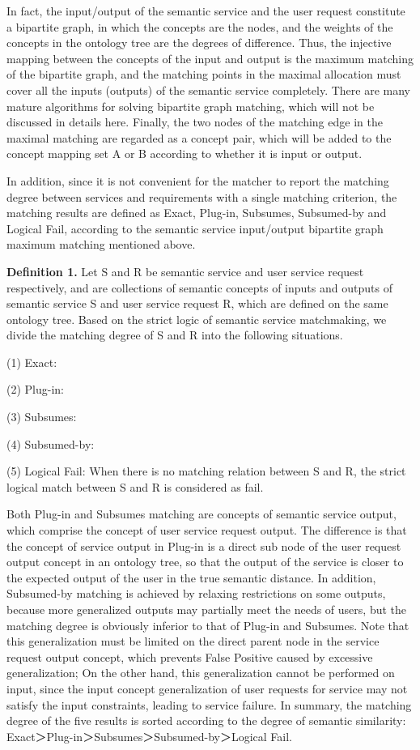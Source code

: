 \documentclass{ieeeaccess}
\begin{document}
In fact, the input/output of the semantic service and the user request constitute a bipartite graph, in which the concepts are the nodes, and the weights of the concepts in the ontology tree are the degrees of difference. Thus, the injective mapping between the concepts of the input and output is the maximum matching of the bipartite graph, and the matching points in the maximal allocation must cover all the inputs (outputs) of the semantic service completely. There are many mature algorithms for solving bipartite graph matching, which will not be discussed in details here. Finally, the two nodes of the matching edge in the maximal matching are regarded as a concept pair, which will be added to the concept mapping set A or B according to whether it is input or output.

In addition, since it is not convenient for the matcher to report the matching degree between services and requirements with a single matching criterion, the matching results are defined as Exact, Plug-in, Subsumes, Subsumed-by and Logical Fail, according to the semantic service input/output bipartite graph maximum matching mentioned above.

\textbf{Definition 1.} Let S and R be semantic service and user service request respectively, and   are collections of semantic concepts of inputs and outputs of semantic service S and user service request R, which are defined on the same ontology tree. Based on the strict logic of semantic service matchmaking, we divide the matching degree of S and R into the following situations.

(1) Exact:
 
(2) Plug-in:
 
(3) Subsumes: 
 
(4) Subsumed-by:
 
(5) Logical Fail: When there is no matching relation between S and R, the strict logical match between S and R is considered as fail.

Both Plug-in and Subsumes matching are concepts of semantic service output, which comprise the concept of user service request output. The difference is that the concept of service output in Plug-in is a direct sub node of the user request output concept in an ontology tree, so that the output of the service is closer to the expected output of the user in the true semantic distance. In addition, Subsumed-by matching is achieved by relaxing restrictions on some outputs, because more generalized outputs may partially meet the needs of users, but the matching degree is obviously inferior to that of Plug-in and Subsumes. Note that this generalization must be limited on the direct parent node in the service request output concept, which prevents False Positive caused by excessive generalization; On the other hand, this generalization cannot be performed on input, since the input concept generalization of user requests for service may not satisfy the input constraints, leading to service failure. In summary, the matching degree of the five results is sorted according to the degree of semantic similarity: Exact＞Plug-in＞Subsumes＞Subsumed-by＞Logical Fail.
\end{document}
